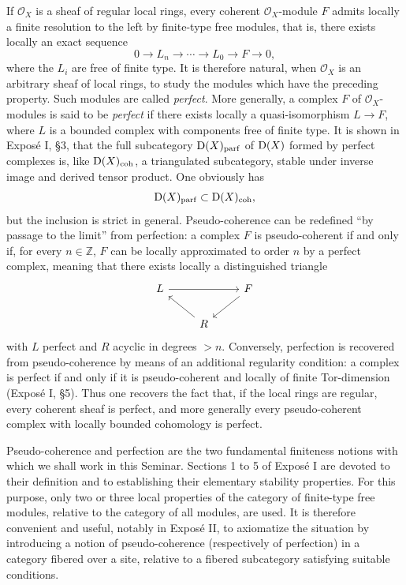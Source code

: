 \documentclass[11pt]{article}
\begin{document}
If \(\mathcal O_X\) is a sheaf of regular local rings, every coherent \(\mathcal O_X\)-module \(F\) admits locally a finite resolution to the left by finite-type free modules, that is, there exists locally an exact sequence
\[
  0\longrightarrow L_n\longrightarrow \cdots \longrightarrow L_0\longrightarrow F\longrightarrow 0,
\]
where the \(L_i\) are free of finite type. It is therefore natural, when \(\mathcal O_X\) is an arbitrary sheaf of local rings, to study the modules which have the preceding property. Such modules are called \emph{perfect}. More generally, a complex \(F\) of \(\mathcal O_X\)-modules is said to be \emph{perfect} if there exists locally a quasi-isomorphism \(L\to F\), where \(L\) is a bounded complex with components free of finite type. It is shown in Exposé I, §3, that the full subcategory \(\mathrm D(X)_{\mathrm{parf}}\) of \(\mathrm D(X)\) formed by perfect complexes is, like \(\mathrm D(X)_{\mathrm{coh}}\), a triangulated subcategory, stable under inverse image and derived tensor product. One obviously has
\[
  \mathrm D(X)_{\mathrm{parf}}\subset \mathrm D(X)_{\mathrm{coh}},
\]
but the inclusion is strict in general. Pseudo-coherence can be redefined ``by passage to the limit'' from perfection: a complex \(F\) is pseudo-coherent if and only if, for every \(n\in\mathbb Z\), \(F\) can be locally approximated to order \(n\) by a perfect complex, meaning that there exists locally a distinguished triangle
\[
\begin{tikzcd}
L \arrow[rr] && F \arrow[dl]\\
& R \arrow[ul] &
\end{tikzcd}
\]
with \(L\) perfect and \(R\) acyclic in degrees \(>n\). Conversely, perfection is recovered from pseudo-coherence by means of an additional regularity condition: a complex is perfect if and only if it is pseudo-coherent and locally of finite Tor-dimension (Exposé I, §5). Thus one recovers the fact that, if the local rings are regular, every coherent sheaf is perfect, and more generally every pseudo-coherent complex with locally bounded cohomology is perfect.

Pseudo-coherence and perfection are the two fundamental finiteness notions with which we shall work in this Seminar. Sections 1 to 5 of Exposé I are devoted to their definition and to establishing their elementary stability properties. For this purpose, only two or three local properties of the category of finite-type free modules, relative to the category of all modules, are used. It is therefore convenient and useful, notably in Exposé II, to axiomatize the situation by introducing a notion of pseudo-coherence (respectively of perfection) in a category fibered over a site, relative to a fibered subcategory satisfying suitable conditions.
\end{document}
